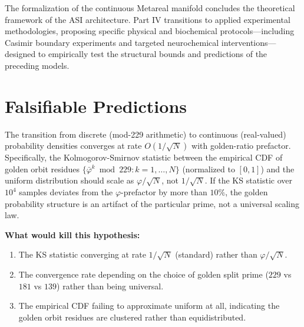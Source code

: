 \vspace{1em}
\noindent The formalization of the continuous Metareal manifold concludes the theoretical framework of the ASI architecture. Part IV transitions to applied experimental methodologies, proposing specific physical and biochemical protocols---including Casimir boundary experiments and targeted neurochemical interventions---designed to empirically test the structural bounds and predictions of the preceding models.

\section{Falsifiable Predictions}

\begin{hypothesis}\label{hyp:golden_convergence}
The transition from discrete (mod-229 arithmetic) to continuous (real-valued) probability densities converges at rate $O(1/\sqrt{N})$ with golden-ratio prefactor. Specifically, the Kolmogorov-Smirnov statistic between the empirical CDF of golden orbit residues $\{\bar{\varphi}^k \bmod 229 : k = 1, \ldots, N\}$ (normalized to $[0,1]$) and the uniform distribution should scale as $\varphi / \sqrt{N}$, not $1/\sqrt{N}$. If the KS statistic over $10^4$ samples deviates from the $\varphi$-prefactor by more than $10\%$, the golden probability structure is an artifact of the particular prime, not a universal scaling law.
\end{hypothesis}

\textbf{What would kill this hypothesis:}
\begin{enumerate}[noitemsep]
  \item The KS statistic converging at rate $1/\sqrt{N}$ (standard) rather than $\varphi/\sqrt{N}$.
  \item The convergence rate depending on the choice of golden split prime ($229$ vs $181$ vs $139$) rather than being universal.
  \item The empirical CDF failing to approximate uniform at all, indicating the golden orbit residues are clustered rather than equidistributed.
\end{enumerate}

